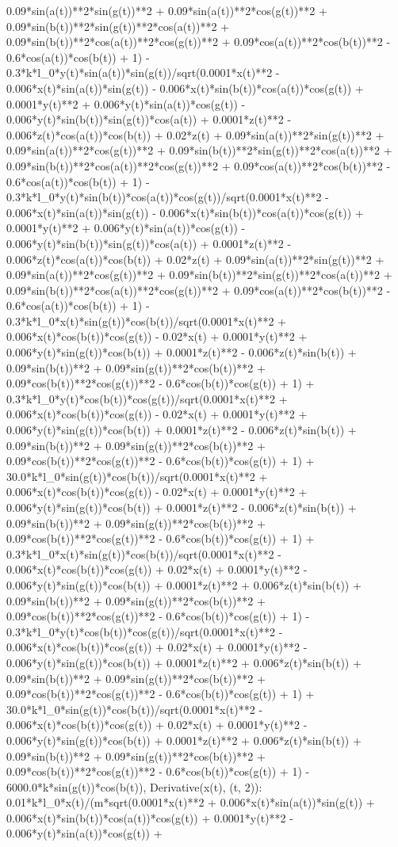 0.09*sin(a(t))**2*sin(g(t))**2 + 0.09*sin(a(t))**2*cos(g(t))**2 + 0.09*sin(b(t))**2*sin(g(t))**2*cos(a(t))**2 + 0.09*sin(b(t))**2*cos(a(t))**2*cos(g(t))**2 + 0.09*cos(a(t))**2*cos(b(t))**2 - 0.6*cos(a(t))*cos(b(t)) + 1) - 0.3*k*l_0*y(t)*sin(a(t))*sin(g(t))/sqrt(0.0001*x(t)**2 - 0.006*x(t)*sin(a(t))*sin(g(t)) - 0.006*x(t)*sin(b(t))*cos(a(t))*cos(g(t)) + 0.0001*y(t)**2 + 0.006*y(t)*sin(a(t))*cos(g(t)) - 0.006*y(t)*sin(b(t))*sin(g(t))*cos(a(t)) + 0.0001*z(t)**2 - 0.006*z(t)*cos(a(t))*cos(b(t)) + 0.02*z(t) + 0.09*sin(a(t))**2*sin(g(t))**2 + 0.09*sin(a(t))**2*cos(g(t))**2 + 0.09*sin(b(t))**2*sin(g(t))**2*cos(a(t))**2 + 0.09*sin(b(t))**2*cos(a(t))**2*cos(g(t))**2 + 0.09*cos(a(t))**2*cos(b(t))**2 - 0.6*cos(a(t))*cos(b(t)) + 1) - 0.3*k*l_0*y(t)*sin(b(t))*cos(a(t))*cos(g(t))/sqrt(0.0001*x(t)**2 - 0.006*x(t)*sin(a(t))*sin(g(t)) - 0.006*x(t)*sin(b(t))*cos(a(t))*cos(g(t)) + 0.0001*y(t)**2 + 0.006*y(t)*sin(a(t))*cos(g(t)) - 0.006*y(t)*sin(b(t))*sin(g(t))*cos(a(t)) + 0.0001*z(t)**2 - 0.006*z(t)*cos(a(t))*cos(b(t)) + 0.02*z(t) + 0.09*sin(a(t))**2*sin(g(t))**2 + 0.09*sin(a(t))**2*cos(g(t))**2 + 0.09*sin(b(t))**2*sin(g(t))**2*cos(a(t))**2 + 0.09*sin(b(t))**2*cos(a(t))**2*cos(g(t))**2 + 0.09*cos(a(t))**2*cos(b(t))**2 - 0.6*cos(a(t))*cos(b(t)) + 1) - 0.3*k*l_0*x(t)*sin(g(t))*cos(b(t))/sqrt(0.0001*x(t)**2 + 0.006*x(t)*cos(b(t))*cos(g(t)) - 0.02*x(t) + 0.0001*y(t)**2 + 0.006*y(t)*sin(g(t))*cos(b(t)) + 0.0001*z(t)**2 - 0.006*z(t)*sin(b(t)) + 0.09*sin(b(t))**2 + 0.09*sin(g(t))**2*cos(b(t))**2 + 0.09*cos(b(t))**2*cos(g(t))**2 - 0.6*cos(b(t))*cos(g(t)) + 1) + 0.3*k*l_0*y(t)*cos(b(t))*cos(g(t))/sqrt(0.0001*x(t)**2 + 0.006*x(t)*cos(b(t))*cos(g(t)) - 0.02*x(t) + 0.0001*y(t)**2 + 0.006*y(t)*sin(g(t))*cos(b(t)) + 0.0001*z(t)**2 - 0.006*z(t)*sin(b(t)) + 0.09*sin(b(t))**2 + 0.09*sin(g(t))**2*cos(b(t))**2 + 0.09*cos(b(t))**2*cos(g(t))**2 - 0.6*cos(b(t))*cos(g(t)) + 1) + 30.0*k*l_0*sin(g(t))*cos(b(t))/sqrt(0.0001*x(t)**2 + 0.006*x(t)*cos(b(t))*cos(g(t)) - 0.02*x(t) + 0.0001*y(t)**2 + 0.006*y(t)*sin(g(t))*cos(b(t)) + 0.0001*z(t)**2 - 0.006*z(t)*sin(b(t)) + 0.09*sin(b(t))**2 + 0.09*sin(g(t))**2*cos(b(t))**2 + 0.09*cos(b(t))**2*cos(g(t))**2 - 0.6*cos(b(t))*cos(g(t)) + 1) + 0.3*k*l_0*x(t)*sin(g(t))*cos(b(t))/sqrt(0.0001*x(t)**2 - 0.006*x(t)*cos(b(t))*cos(g(t)) + 0.02*x(t) + 0.0001*y(t)**2 - 0.006*y(t)*sin(g(t))*cos(b(t)) + 0.0001*z(t)**2 + 0.006*z(t)*sin(b(t)) + 0.09*sin(b(t))**2 + 0.09*sin(g(t))**2*cos(b(t))**2 + 0.09*cos(b(t))**2*cos(g(t))**2 - 0.6*cos(b(t))*cos(g(t)) + 1) - 0.3*k*l_0*y(t)*cos(b(t))*cos(g(t))/sqrt(0.0001*x(t)**2 - 0.006*x(t)*cos(b(t))*cos(g(t)) + 0.02*x(t) + 0.0001*y(t)**2 - 0.006*y(t)*sin(g(t))*cos(b(t)) + 0.0001*z(t)**2 + 0.006*z(t)*sin(b(t)) + 0.09*sin(b(t))**2 + 0.09*sin(g(t))**2*cos(b(t))**2 + 0.09*cos(b(t))**2*cos(g(t))**2 - 0.6*cos(b(t))*cos(g(t)) + 1) + 30.0*k*l_0*sin(g(t))*cos(b(t))/sqrt(0.0001*x(t)**2 - 0.006*x(t)*cos(b(t))*cos(g(t)) + 0.02*x(t) + 0.0001*y(t)**2 - 0.006*y(t)*sin(g(t))*cos(b(t)) + 0.0001*z(t)**2 + 0.006*z(t)*sin(b(t)) + 0.09*sin(b(t))**2 + 0.09*sin(g(t))**2*cos(b(t))**2 + 0.09*cos(b(t))**2*cos(g(t))**2 - 0.6*cos(b(t))*cos(g(t)) + 1) - 6000.0*k*sin(g(t))*cos(b(t)), Derivative(x(t), (t, 2)): 0.01*k*l_0*x(t)/(m*sqrt(0.0001*x(t)**2 + 0.006*x(t)*sin(a(t))*sin(g(t)) + 0.006*x(t)*sin(b(t))*cos(a(t))*cos(g(t)) + 0.0001*y(t)**2 - 0.006*y(t)*sin(a(t))*cos(g(t)) + 